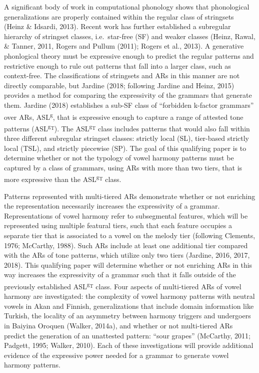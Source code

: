 \documentclass[,doc,floatsintext]{apa6}
\theoremstyle{definition}
\theoremstyle{definition}
\theoremstyle{definition}
\theoremstyle{remark}
\begin{document}
A significant body of work in computational phonology shows that
phonological generalizations are properly contained within the regular
class of stringsets (Heinz \& Idsardi, 2013). Recent work has further
established a subregular hierarchy of stringset classes, i.e.~star-free
(SF) and weaker classes (Heinz, Rawal, \& Tanner, 2011, Rogers and
Pullum (2011); Rogers et al., 2013). A generative phonlogical theory
must be expressive enough to predict the regular patterns and
restrictive enough to rule out patterns that fall into a larger class,
such as context-free. The classifications of stringsets and ARs in this
manner are not directly comparable, but Jardine (2018; following Jardine
and Heinz, 2015) provides a method for comparing the expressivity of the
grammars that generate them. Jardine (2018) establishes a sub-SF class
of \enquote{forbidden k-factor grammars} over ARs,
ASL\textsuperscript{g}, that is expressive enough to capture a range of
attested tone patterns (ASL\textsuperscript{g\textsubscript{T}}). The
ASL\textsuperscript{g\textsubscript{T}} class includes patterns that
would also fall within three different subregular stringset classes:
strictly local (SL), tier-based strictly local (TSL), and strictly
piecewise (SP). The goal of this qualifying paper is to determine
whether or not the typology of vowel harmony patterns must be captured
by a class of grammars, using ARs with more than two tiers, that is more
expressive than the ASL\textsuperscript{g\textsubscript{T}} class.

Patterns represented with multi-tiered ARs demonstrate whether or not
enriching the representation necessarily increases the expressivity of a
grammar. Representations of vowel harmony refer to subsegmental
features, which will be represented using multiple featural tiers, such
that each feature occupies a separate tier that is associated to a vowel
on the melody tier (following Clements, 1976; McCarthy, 1988). Such ARs
include at least one additional tier compared with the ARs of tone
patterns, which utilize only two tiers (Jardine, 2016, 2017, 2018). This
qualifying paper will determine whether or not enriching ARs in this way
increases the expressivity of a grammar such that it falls outside of
the previously established ASL\textsuperscript{g\textsubscript{T}}
class. Four aspects of multi-tiered ARs of vowel harmony are
investigated: the complexity of vowel harmony patterns with neutral
vowels in Akan and Finnish, generalizations that include domain
information like Turkish, the locality of an asymmetry between harmony
triggers and undergoers in Baiyina Oroquen (Walker, 2014a), and whether
or not multi-tiered ARs predict the generation of an unattested pattern:
\enquote{sour grapes} (McCarthy, 2011; Padgett, 1995; Walker, 2010).
Each of these investigations will provide additional evidence of the
expressive power needed for a grammar to generate vowel harmony
patterns.
\end{document}
